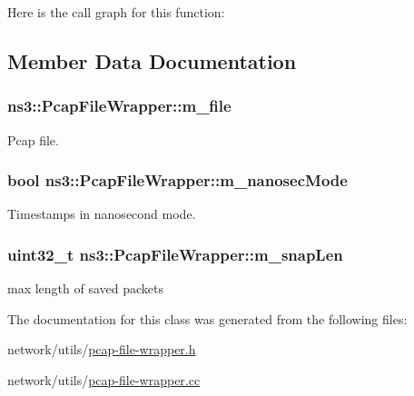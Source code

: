 Here is the call graph for this function\+:




\subsection{Member Data Documentation}
\subsubsection[{\texorpdfstring{m\+\_\+file}{m_file}}]{ ns3\+::\+Pcap\+File\+Wrapper\+::m\+\_\+file\hspace{0.3cm}{\ttfamily [private]}}\hypertarget{classns3_1_1PcapFileWrapper_a10e005fc71286fc660bc21c1dd10ad18}{}\label{classns3_1_1PcapFileWrapper_a10e005fc71286fc660bc21c1dd10ad18}


Pcap file. 

\subsubsection[{\texorpdfstring{m\+\_\+nanosec\+Mode}{m_nanosecMode}}]{\setlength{\rightskip}{0pt plus 5cm}bool ns3\+::\+Pcap\+File\+Wrapper\+::m\+\_\+nanosec\+Mode\hspace{0.3cm}{\ttfamily [private]}}\hypertarget{classns3_1_1PcapFileWrapper_aefa7cc2c0286d92eb3bfb50cc382f3ff}{}\label{classns3_1_1PcapFileWrapper_aefa7cc2c0286d92eb3bfb50cc382f3ff}


Timestamps in nanosecond mode. 

\subsubsection[{\texorpdfstring{m\+\_\+snap\+Len}{m_snapLen}}]{\setlength{\rightskip}{0pt plus 5cm}uint32\+\_\+t ns3\+::\+Pcap\+File\+Wrapper\+::m\+\_\+snap\+Len\hspace{0.3cm}{\ttfamily [private]}}\hypertarget{classns3_1_1PcapFileWrapper_a3c8cfde5e7aaf2c1ecfef7646a8032db}{}\label{classns3_1_1PcapFileWrapper_a3c8cfde5e7aaf2c1ecfef7646a8032db}


max length of saved packets 



The documentation for this class was generated from the following files\+:\begin{DoxyCompactItemize}
\item 
network/utils/\hyperlink{pcap-file-wrapper_8h}{pcap-\/file-\/wrapper.\+h}\item 
network/utils/\hyperlink{pcap-file-wrapper_8cc}{pcap-\/file-\/wrapper.\+cc}\end{DoxyCompactItemize}
